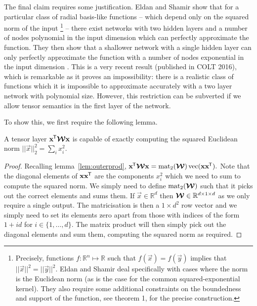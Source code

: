 The final claim requires some justification.
Eldan and Shamir show that for a
particular class of radial basis-like functions -- which depend only on the squared norm of the 
input
\footnote{Precisely, functions \(f : \mathbb{R}^n \mapsto \mathbb{R}\) such that
\(f(\vec{x}) = f(\vec{y})\) implies that \(||\vec{x}||^2 = ||\vec{y}||^2\). Eldan and Shamir
deal specifically with cases where the norm is the Euclidean norm (as is the case for the
common squared-exponential kernel). They also
require some additional constraints on the boundedness and support of the function, see
\autocite{Eldan2016} theorem 1, for the precise construction.} --
there exist networks with two hidden layers and a number of nodes polynomial in the input dimension
which can perfectly approximate the function. They then show that a shallower network with a single
hidden layer can only perfectly approximate the function with a number of nodes exponential in the
input dimension \autocite{Eldan2016}. This is a very recent result (published in COLT 2016), which
is remarkable as it proves an impossibility: there is a realistic class of functions which it is
impossible to approximate accurately with a two layer network with polynomial size. However,
this restriction can be subverted if we allow tensor semantics in the first layer of the network.

To show this, we first require the following lemma.
\begin{lem}\label{lem:sqnorm}
	A tensor layer \(\mathbf{x}^{\mkern-1.5mu\mathsf{T}}\bm{\mathcal{W}}\mathbf{x}\) is capable of exactly computing the squared
	Euclidean norm \(||\vec{x}||^2_2 = \sum_i x_i^2\).
\end{lem}
\begin{proof}
Recalling lemma~\ref{lem:outerprod},
\( \label{eq:outerquad}
	\mathbf{x}^{\mkern-1.5mu\mathsf{T}}\bm{\mathcal{W}}\mathbf{x} = \operatorname{mat}_2(\bm{\mathcal{W}}) \operatorname{vec}(\mathbf{x}\mathbf{x}^{\mkern-1.5mu\mathsf{T}}).
\) Note that the diagonal elements of \(\mathbf{x}\mathbf{x}^{\mkern-1.5mu\mathsf{T}}\) are the components
\(x_i^2\) which we need to sum to compute the squared norm. We simply need to define
\(\operatorname{mat}_2(\bm{\mathcal{W}})\) such that it picks out the correct elements and sums them. If 
\(\vec{x} \in \mathbb{R}^d\) then \(\bm{\mathcal{W}} \in \mathbb{R}^{d \times 1 \times d}\) as we only
require a single output. The matricisation is then a \(1 \times d^2\) row vector and we simply need
to set its elements zero apart from those with indices of the form \(1 + id\) for 
\(i \in \{1, \ldots, d\}\). The matrix product will then simply pick out the diagonal elements and
sum them, computing the squared norm as required.
\end{proof}

